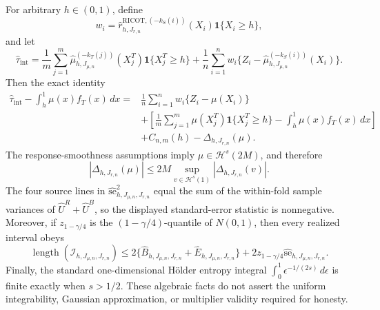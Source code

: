 For arbitrary \(h\in(0,1)\), define
\[
w_i=\widehat r^{\mathrm{RICOT},(-k_S(i))}_{h,J_{r,n}}(X_i)\mathbf 1\{X_i\ge h\},
\]
and let
\[
\widehat\tau_{\mathrm{int}}
=\frac1m\sum_{j=1}^m\widehat\mu_{h,J_{\mu,n}}^{(-k_T(j))}(X_j^T)\mathbf 1\{X_j^T\ge h\}
+\frac1n\sum_{i=1}^nw_i\{Z_i-\widehat\mu_{h,J_{\mu,n}}^{(-k_S(i))}(X_i)\}.
\]
Then the exact identity
\[
\begin{aligned}
\widehat\tau_{\mathrm{int}}-\int_h^1\mu(x)f_T(x)\,dx
={}&\frac1n\sum_{i=1}^nw_i\{Z_i-\mu(X_i)\}\\
&+\left[\frac1m\sum_{j=1}^m\mu(X_j^T)\mathbf 1\{X_j^T\ge h\}-\int_h^1\mu(x)f_T(x)\,dx\right]\\
&+C_{n,m}(h)-\Delta_{h,J_{r,n}}(\mu).
\end{aligned}
\]
The response-smoothness assumptions imply \(\mu\in\mathcal H^s(2M)\), and therefore
\[
|\Delta_{h,J_{r,n}}(\mu)|\le2M\sup_{v\in\mathcal H^s(1)}|\Delta_{h,J_{r,n}}(v)|.
\]
The four source lines in \(\widehat{\mathrm{se}}_{h,J_{\mu,n},J_{r,n}}^2\) equal the sum of the within-fold sample variances of \(\widehat U^R+\widehat U^B\), so the displayed standard-error statistic is nonnegative. Moreover, if \(z_{1-\gamma/4}\) is the \((1-\gamma/4)\)-quantile of \(N(0,1)\), then every realized interval obeys
\[
\operatorname{length}(\mathcal I_{h,J_{\mu,n},J_{r,n}})
\le2\{\widehat B_{h,J_{\mu,n},J_{r,n}}+\widehat E_{h,J_{\mu,n},J_{r,n}}\}
+2z_{1-\gamma/4}\widehat{\mathrm{se}}_{h,J_{\mu,n},J_{r,n}}.
\]
Finally, the standard one-dimensional Hölder entropy integral \(\int_0^1\epsilon^{-1/(2s)}\,d\epsilon\) is finite exactly when \(s>1/2\). These algebraic facts do not assert the uniform integrability, Gaussian approximation, or multiplier validity required for honesty.